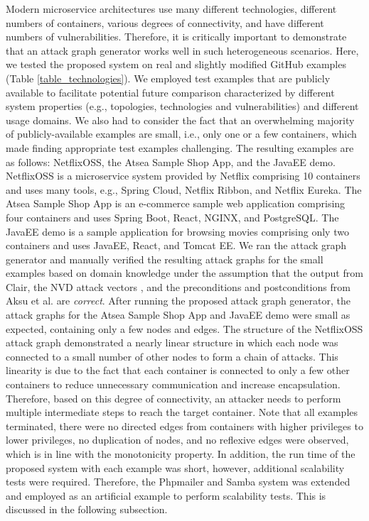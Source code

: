 Modern microservice architectures use many different technologies,  different numbers of containers, various degrees of connectivity, and have different numbers of vulnerabilities. Therefore, it is critically important to demonstrate that an attack graph generator works well in such heterogeneous scenarios. Here, we tested the proposed system on real and slightly modified GitHub examples (Table \ref{table_technologies}). We employed test examples that are publicly available to facilitate potential future comparison characterized by different system properties (e.g., topologies, technologies and vulnerabilities) and different usage domains. We also had to consider the fact that an overwhelming majority of publicly-available examples are small, i.e., only one or a few containers, which made finding appropriate test examples challenging. The resulting examples are as follows: NetflixOSS, the Atsea Sample Shop App, and the JavaEE demo. NetflixOSS is a microservice system provided by Netflix comprising 10 containers and uses many tools, e.g., Spring Cloud, Netflix Ribbon, and Netflix Eureka. The Atsea Sample Shop App is an e-commerce sample web application comprising four containers and uses Spring Boot, React, NGINX, and PostgreSQL. The JavaEE demo is a sample application for browsing movies comprising only two containers and uses JavaEE, React, and Tomcat EE. We ran the attack graph generator and manually verified the resulting attack graphs for the small examples based on domain knowledge under the assumption that the output from Clair, the NVD attack vectors \cite{booth2013national}, and the preconditions and postconditions from Aksu et al. \cite{aksu2018automated} are \textit{correct}. After running the proposed attack graph generator, the attack graphs for the Atsea Sample Shop App and JavaEE demo were small as expected, containing only a few nodes and edges. The structure of the NetflixOSS attack graph demonstrated a nearly linear structure in which each node was connected to a small number of other nodes to form a chain of attacks. This linearity is due to the fact that each container is connected to only a few other containers to reduce unnecessary communication and increase encapsulation. Therefore, based on this degree of connectivity, an attacker needs to perform multiple intermediate steps to reach the target container. Note that all examples terminated, there were no directed edges from containers with higher privileges to lower privileges, no duplication of nodes, and no reflexive edges were observed, which is in line with the monotonicity property. In addition, the run time of the proposed system with each example was short, however, additional scalability tests were required. Therefore, the Phpmailer and Samba system was extended and employed as an artificial example to perform scalability tests. This is discussed in the following subsection.



